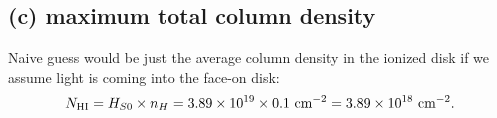 \documentclass[12pt,letterpaper]{article}
\newcommand{\cm}{\textrm{\,cm}}
\newcommand{\nhi}{N_{\textrm{HI}}}
\begin{document}
\subsection*{(c) maximum total column density}

Naive guess would be just the average column density in the ionized disk if we assume light is coming into the face-on disk:
\begin{equation}
    \nhi = H_{S0} \times n_H = 3.89 \times 10^{19}
    \times 0.1 \, \cm^{-2} = 3.89 \times 10^{18} \, \cm^{-2}.
\end{equation} 
\end{document}
